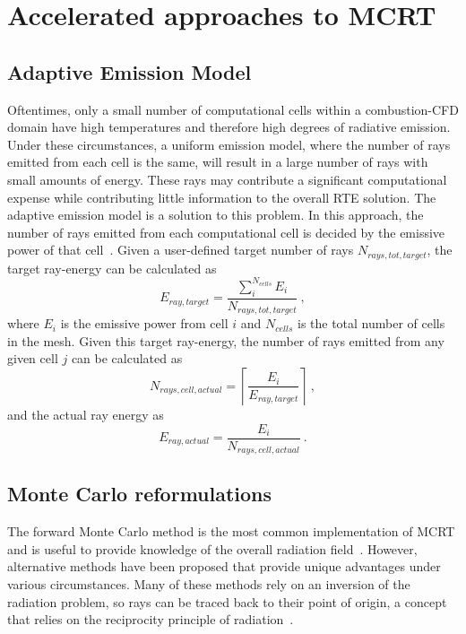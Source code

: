 \section{Accelerated approaches to MCRT}

\subsection{Adaptive Emission Model}\label{section:adaptiveemission}
Oftentimes, only a small number of computational cells within a combustion-CFD domain have high temperatures and therefore high degrees of radiative emission. Under these circumstances, a uniform emission model, where the number of rays emitted from each cell is the same, will result in a large number of rays with small amounts of energy. These rays may contribute a significant computational expense while contributing little information to the overall RTE solution.
The adaptive emission model is a solution to this problem. In this approach, the number of rays emitted from each computational cell is decided by the emissive power of that cell~\cite{Wang2007AnFields}.
Given a user-defined target number of rays $N_{rays,tot,target}$, the target ray-energy can be calculated as 
\begin{equation}
    E_{ray,target}=\frac{\sum^{N_{cells}}_{i}E_{i}}{N_{rays,tot,target}}~,
    \label{eq:TargetRayEnergy}
\end{equation}
where $E_i$ is the emissive power from cell $i$ and $N_{cells}$ is the total number of cells in the mesh. 
Given this target ray-energy, the number of rays emitted from any given cell $j$ can be calculated as
\begin{equation}
    N_{rays,cell,actual}=\left\lceil{\frac{E_{i}}{E_{ray,target}}}\right\rceil{}~,
    \label{eq:NumberOfRays}
\end{equation}
and the actual ray energy as
\begin{equation}
    E_{ray,actual}=\frac{E_{i}}{N_{rays,cell,actual}}~.
    \label{eq:RayEnergies}
\end{equation}

\subsection{Monte Carlo reformulations}\label{section:reformulations}
The forward Monte Carlo method is the most common implementation of MCRT and is useful to provide knowledge of the overall radiation field~\cite{Modest2022ChapterMediac}. However, alternative methods have been proposed that provide unique advantages under various circumstances.
Many of these methods rely on an inversion of the radiation problem, so rays can be traced back to their point of origin, a concept that relies on the reciprocity principle of radiation~\cite{Case1957TransferPrinciple}.

